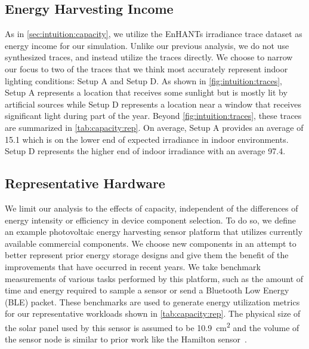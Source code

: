\subsection{Energy Harvesting Income}
As in \cref{sec:intuition:capacity}, we utilize the EnHANTs irradiance trace dataset as energy income for our simulation.
Unlike our previous analysis, we do not use synthesized traces, and instead utilize the traces directly.
We choose to narrow our focus to two of the traces that we think most accurately represent indoor lighting conditions: Setup A and Setup D.
As shown in \cref{fig:intuition:traces}, Setup A represents a location that receives some sunlight but is mostly lit by artificial sources while Setup D represents a location near a window that receives significant light during part of the year.
Beyond \cref{fig:intuition:traces}, these traces are summarized in \cref{tab:capacity:rep}.
On average, Setup A provides an average of 15.1\ssi[per-mode=symbol]{\micro\watt\per\centi\meter\squared} which is on the lower end of expected irradiance in indoor environments. Setup D represents the higher end of indoor irradiance with an average 97.4\ssi[per-mode=symbol]{\micro\watt\per\centi\meter\squared}.

\subsection{Representative Hardware}
We limit our analysis to the effects of capacity,
independent of the differences of energy intensity or efficiency in device
component selection. To do so, we define an example photovoltaic energy harvesting
sensor platform that utilizes currently available commercial
components.
We choose new
components in an attempt to better represent prior energy storage designs and
give them the benefit of the improvements that have occurred in recent years.
We take benchmark
measurements of various tasks performed by this platform, such as the
amount of time and energy required to sample a sensor or send a Bluetooth Low
Energy (BLE) packet. These benchmarks are used to generate energy utilization metrics
for our representative workloads shown in \cref{tab:capacity:rep}.
The physical size of the solar panel used by this sensor
is assumed to be
10.9~cm\textsuperscript{2} and the volume of the sensor node is similar to prior
work like the Hamilton sensor~\cite{kim2018system}.

